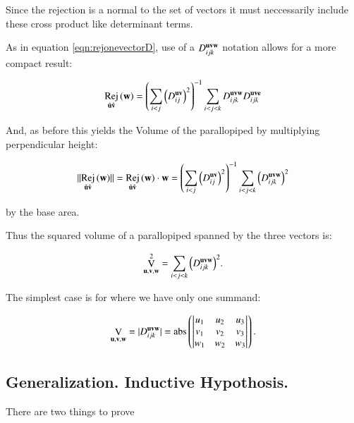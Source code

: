 \documentclass{article}      %
\DeclareMathOperator{\AbsName}{abs}
\DeclareMathOperator{\RejName}{Rej}
\newcommand{\Rej}[2]{\RejName_{#1}\left( {#2} \right)}
\DeclareMathOperator{\VName}{V}
\newcommand{\VolumeOp}[1]{\VName_{#1}}
\begin{document}
Since the rejection is a normal to the set of vectors it must neccessarily include these cross product like determinant terms.

As in equation \ref{eqn:rejonevectorD}, use of a $D_{ijk}^{\mathbf{u}\mathbf{v}\mathbf{w}}$ notation allows for a more compact
result:

\begin{equation}\label{eqn:rejtwovectorsD}
\Rej{\ucap\vcap}{\Bw} = 
{\left(\sum_{i<j} \left(D_{ij}^{\Bu\Bv}\right)^2\right)}^{-1}
\sum_{i<j<k} D_{ijk}^{\Bu\Bv\Bw} D_{ijk}^{\Bu\Bv\Be}
\end{equation}

And, as before this yields the Volume of the parallopiped by multiplying perpendicular height:

\[
\norm{\Rej{\ucap\vcap}{\Bw}} =
\Rej{\ucap\vcap}{\Bw} \cdot \Bw =
{\left(\sum_{i<j} \left(D_{ij}^{\Bu\Bv}\right)^2\right)}^{-1}
\sum_{i<j<k} \left(D_{ijk}^{\Bu\Bv\Bw} \right)^2
\]

by the base area.

Thus the squared volume of a parallopiped spanned by the three vectors is:

\begin{equation}\label{eqn:parallopipedvolume}
\VolumeOp{\Bu,\Bv,\Bw}^2 = \sum_{i<j<k} {\left(D_{ijk}^{\Bu \Bv \Bw}\right)}^2.
\end{equation}

The simplest case is for  where we have only one summand:

\begin{equation}\label{eqn:parallopipedvolumer3}
\VolumeOp{\Bu,\Bv,\Bw} 
= \abs{D_{ijk}^{\Bu \Bv \Bw}}
= \AbsName\left(
\DETuvwijk{u}{v}{w}{1}{2}{3}
\right).
\end{equation}

\subsection{ Generalization.  Inductive Hypothosis. }

There are two things to prove
\end{document}
